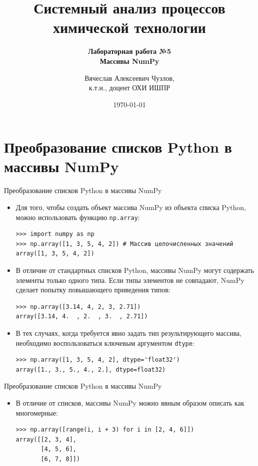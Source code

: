 \documentclass[aspectratio=169, mathserif]{beamer}%
\title{\LARGE{Системный анализ процессов химической технологии}}
\subtitle{\textcolor{tpugreen}{\textbf{Лабораторная работа №5}} \\ \textbf{Массивы NumPy}}
\author[]{Вячеслав Алексеевич Чузлов, \\
к.т.н., доцент ОХИ ИШПР}
\date{\today}
\begin{document}
\newcommand{\pythoninline}[1]{%
	\colorbox{white}{%
		\parbox[b][.6em]{\widthof{\texttt{#1}}}{\texttt{#1}}%
	}%
}


\titleframe%




\section{Преобразование списков Python в массивы NumPy}
\begin{frame}[fragile]{Преобразование списков Python в массивы NumPy}
\scriptsize
\begin{itemize}
	\item Для того, чтобы создать объект массива NumPy из объекта списка Python, можно использовать функцию \texttt{np.array}:
\begin{verbatim}
>>> import numpy as np
>>> np.array([1, 3, 5, 4, 2]) # Массив целочисленных значений
array([1, 3, 5, 4, 2])
\end{verbatim}

\item В отличие от стандартных списков Python, массивы NumPy могут содержать элементы только одного типа. Если типы элементов не совпадают, NumPy сделает попытку повышающего приведения типов:

\begin{verbatim}
>>> np.array([3.14, 4, 2, 3, 2.71])
array([3.14, 4.  , 2.  , 3.  , 2.71])
\end{verbatim}

\item В тех случаях, когда требуется явно задать тип результирующего массива, необходимо воспользоваться ключевым аргументом \texttt{dtype}:

\begin{verbatim}
>>> np.array([1, 3, 5, 4, 2], dtype='float32')
array([1., 3., 5., 4., 2.], dtype=float32)
\end{verbatim}
\end{itemize}
\vfill
\end{frame}

\begin{frame}[fragile]{Преобразование списков Python в массивы NumPy}
\scriptsize
\begin{itemize}
	\item В отличие от списков, массивы NumPy можно явным образом описать как многомерные:

\begin{verbatim}
>>> np.array([range(i, i + 3) for i in [2, 4, 6]])
array([[2, 3, 4],
       [4, 5, 6],
       [6, 7, 8]])
\end{verbatim}
\end{itemize}
\vfill
\end{frame}
\end{document}
